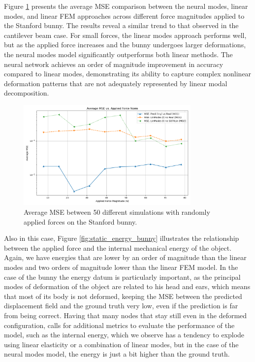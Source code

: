 Figure \ref{fig:static_mse_bunny} presents the average MSE comparison between the neural modes, linear modes, and linear FEM approaches across different force magnitudes applied to the Stanford bunny. The results reveal a similar trend to that observed in the cantilever beam case. For small forces, the linear modes approach performs well, but as the applied force increases and the bunny undergoes larger deformations, the neural modes model significantly outperforms both linear methods. The neural network achieves an order of magnitude improvement in accuracy compared to linear modes, demonstrating its ability to capture complex nonlinear deformation patterns that are not adequately represented by linear modal decomposition.
\begin{figure}[ht]
    \centering
    \includegraphics[width=0.8\textwidth]{Images/bunny_static_mse.png}
    \caption{Average MSE between 50 different simulations with randomly applied forces on the Stanford bunny.}
    \label{fig:static_mse_bunny}
    \end{figure}

Also in this case, Figure \ref{fig:static_energy_bunny} illustrates the relationship between the applied force and the internal mechanical energy of the object. Again, we have energies that are lower by an order of magnitude than the linear modes and two orders of magnitude lower than the linear FEM model. In the case of the bunny the energy datum is particularly important, as the principal modes of deformation of the object are related to his head and ears, which means that most of its body is not deformed, keeping the MSE between the predicted displacement field and the ground truth very low, even if the prediction is far from being correct. Having that many nodes that stay still even in the deformed configuration, calls for additional metrics to evaluate the performance of the model, such as the internal energy, which we observe has a tendency to explode using linear elasticity or a combination of linear modes, but in the case of the neural modes model, the energy is just a bit higher than the ground truth.

